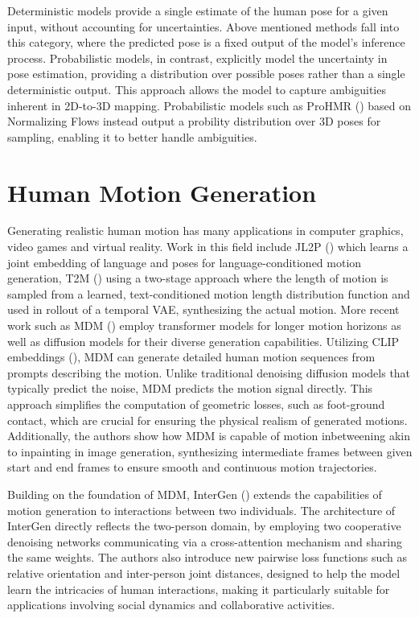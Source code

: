 Deterministic models provide a single estimate of the human pose for a given input, without accounting for uncertainties. Above mentioned methods fall into this category, where the predicted pose is a fixed output of the model's inference process. Probabilistic models, in contrast, explicitly model the uncertainty in pose estimation, providing a distribution over possible poses rather than a single deterministic output. This approach allows the model to capture ambiguities inherent in 2D-to-3D mapping. Probabilistic models such as ProHMR (\cite{kolotouros2021prohmr}) based on Normalizing Flows instead output a probility distribution over 3D poses for sampling, enabling it to better handle ambiguities.



\section{Human Motion Generation}
Generating realistic human motion has many applications in computer graphics, video games and virtual reality. Work in this field include JL2P (\cite{ahuja2019language2posenaturallanguagegrounded}) which learns a joint embedding of language and poses for language-conditioned motion generation, T2M (\cite{Guo_2022_CVPR}) using a two-stage approach where the length of motion is sampled from a learned, text-conditioned motion length distribution function and used in rollout of a temporal VAE, synthesizing the actual motion. More recent work such as MDM (\cite{tevet2023human}) employ transformer models for longer motion horizons as well as diffusion models for their diverse generation capabilities. Utilizing CLIP embeddings (\cite{radford2021learning}), MDM can generate detailed human motion sequences from prompts describing the motion. Unlike traditional denoising diffusion models that typically predict the noise, MDM predicts the motion signal directly. This approach simplifies the computation of geometric losses, such as foot-ground contact, which are crucial for ensuring the physical realism of generated motions. Additionally, the authors show how MDM is capable of motion inbetweening akin to inpainting in image generation, synthesizing intermediate frames between given start and end frames to ensure smooth and continuous motion trajectories. 

Building on the foundation of MDM, InterGen (\cite{liang2024intergen}) extends the capabilities of motion generation to interactions between two individuals. The architecture of InterGen directly reflects the two-person domain, by employing two cooperative denoising networks communicating via a cross-attention mechanism and sharing the same weights. The authors also introduce new pairwise loss functions such as relative orientation and inter-person joint distances, designed to help the model learn the intricacies of human interactions, making it particularly suitable for applications involving social dynamics and collaborative activities. 

